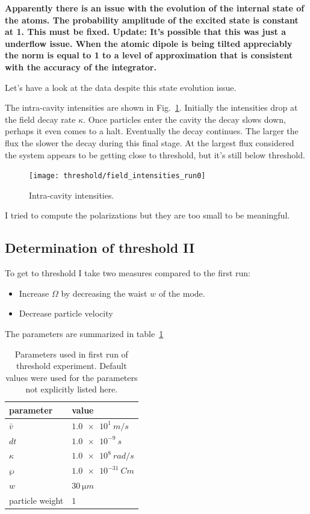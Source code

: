 \documentclass[aps, superscriptaddress, groupedaddress, preprint]{revtex4}
\newcommand\note[1]{{\bf #1}}
\begin{document}
\note{Apparently there is an issue with the evolution of the
  internal state of the atoms.  The probability amplitude of the
  excited state is constant at 1.  This must be fixed.  Update:
  It's possible that this was just a underflow issue.  When the
  atomic dipole is being tilted appreciably the norm is equal to
  1 to a level of approximation that is consistent with the
  accuracy of the integrator.}

Let's have a look at the data despite this state evolution issue.

The intra-cavity intensities are shown in
Fig.~\ref{fig:FieldIntensities}.  Initially the intensities drop
at the field decay rate $\kappa$.  Once particles enter the
cavity the decay slows down, perhaps it even comes to a halt.
Eventually the decay continues.  The larger the flux the slower
the decay during this final stage.  At the largest flux
considered the system appears to be getting close to threshold,
but it's still below threshold.
\begin{figure}
  \texttt{[image: threshold/field\_intensities\_run0]}
  \caption{Intra-cavity intensities.}\label{fig:FieldIntensities}
\end{figure}

I tried to compute the polarizations but they are too small to be
meaningful.


\subsection{Determination of threshold II}

To get to threshold I take two measures compared to the first
run:
\begin{itemize}

\item Increase $\Omega$ by decreasing the waist $w$ of the mode.

\item Decrease particle velocity

\end{itemize}
The parameters are summarized in table~\ref{tab:Run2Params}
\begin{table}
  \begin{tabular}{|l|l|}
    \hline
    parameter       & value\\
    \hline
    \hline
    $\bar v$        & $\SI{1.0e1}{m/s}$\\
    \hline
    $dt$            & $\SI{1.0e-9}{s}$\\
    \hline
    $\kappa$        & $\SI{1.0e8}{rad/s}$\\
    \hline
    $\wp$           & $\SI{1.0e-31}{Cm}$\\
    \hline
    $w$             & $\SI{30}{\micro m}$\\
    \hline
    particle weight & $1$\\
    \hline
  \end{tabular}
  \caption{Parameters used in first run of threshold experiment.
    Default values were used for the parameters not explicitly
    listed here.}
  \label{tab:Run2Params}
\end{table}
\end{document}
